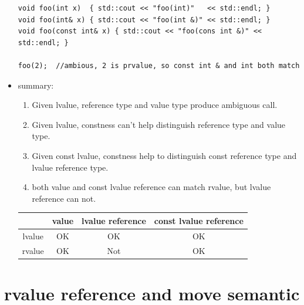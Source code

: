 \documentclass[a4paper,11pt,twoside]{book}
\begin{document}
\begin{itemize}
\begin{lstlisting}[numbers=none]
void foo(int x)  { std::cout << "foo(int)"   << std::endl; }
void foo(int& x) { std::cout << "foo(int &)" << std::endl; }
void foo(const int& x) { std::cout << "foo(cons int &)" << std::endl; }
	
foo(2);	 //ambious, 2 is prvalue, so const int & and int both match
\end{lstlisting}

\item summary:
\begin{enumerate}
	\item Given lvalue, reference type and value type produce ambiguous call.
	\item Given lvalue, constness can't help distinguish reference type and value type.
	\item Given const lvalue, constness help to distinguish const reference type and lvalue reference type.
	\item both value and const lvalue reference can match rvalue, but lvalue reference can not. 
\end{enumerate}
\begin{center}
	\begin{tabular}{|c|c|c|c|}
		\hline
		& value & lvalue reference  & const lvalue reference  \\
		\hline
		lvalue & OK &  OK & OK  \\
		\hline
		rvalue & OK & Not & OK   \\
		\hline
	\end{tabular}
\end{center}

\end{itemize}

\section{rvalue reference and move semantic}
\end{document}
